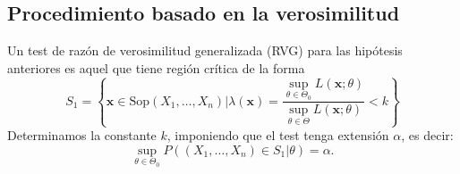 \subsection{Procedimiento basado en la verosimilitud}
\begin{tcolorbox}[colback=blue!5!white, colframe=blue!75!black, title=\textbf{Test de razón de verosimilitud generalizada}]
Un test de razón de verosimilitud generalizada (RVG) para las hipótesis anteriores es aquel que tiene región crítica de la forma \[
S_1=\left\{ \mathbf{x}\in \mathrm{Sop}(X_1,\dots,X_n)|\lambda(\mathbf{x})=\dfrac{\displaystyle \sup_{\theta\in \Theta_0}L(\mathbf{x};\theta)}{\displaystyle \sup_{\theta\in \Theta}L(\mathbf{x};\theta)}<k \right\} 
\] 
Determinamos la constante $k$, imponiendo que el test tenga extensión $\alpha$, es decir: \[
\sup_{\theta\in\Theta_0}P((X_1,\dots,X_n)\in S_1|\theta)=\alpha.
\] 
\end{tcolorbox}
